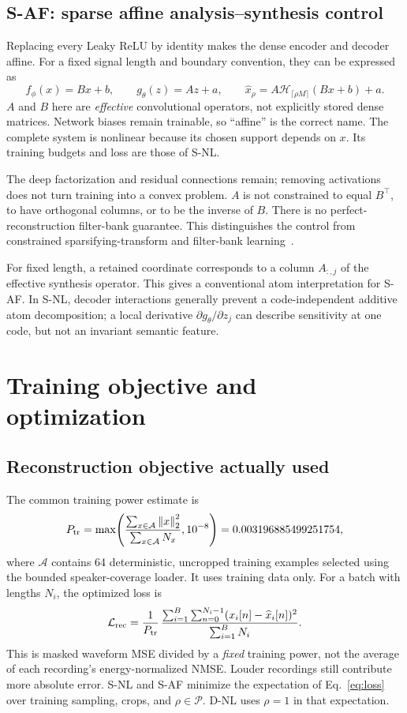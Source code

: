 \documentclass[11pt,a4paper]{article}
\newcommand{\norm}[1]{\left\lVert#1\right\rVert}
\begin{document}
\subsection{S-AF: sparse affine analysis--synthesis control}
Replacing every Leaky ReLU by identity makes the dense encoder and decoder affine. For a fixed signal length and boundary convention, they can be expressed as
\begin{equation}
 f_\phi(x)=Bx+b,\qquad g_\theta(z)=Az+a,
 \qquad \widehat x_\rho=A\mathcal H_{\lceil\rho M\rceil}(Bx+b)+a.
 \label{eq:affine}
\end{equation}
$A$ and $B$ here are \emph{effective} convolutional operators, not explicitly stored dense matrices. Network biases remain trainable, so ``affine'' is the correct name. The complete system is nonlinear because its chosen support depends on $x$. Its training budgets and loss are those of S-NL.

The deep factorization and residual connections remain; removing activations does not turn training into a convex problem. $A$ is not constrained to equal $B^\top$, to have orthogonal columns, or to be the inverse of $B$. There is no perfect-reconstruction filter-bank guarantee. This distinguishes the control from constrained sparsifying-transform and filter-bank learning~\cite{ravishankar2013,pfister2019}.

For fixed length, a retained coordinate corresponds to a column $A_{:,j}$ of the effective synthesis operator. This gives a conventional atom interpretation for S-AF. In S-NL, decoder interactions generally prevent a code-independent additive atom decomposition; a local derivative $\partial g_\theta/\partial z_j$ can describe sensitivity at one code, but not an invariant semantic feature.

\section{Training objective and optimization}
\subsection{Reconstruction objective actually used}
The common training power estimate is
\begin{equation}
 P_{\rm tr}=\max\!\left(\frac{\sum_{x\in\mathcal A}\norm{x}_2^2}{\sum_{x\in\mathcal A}N_x},10^{-8}\right)
 =0.003196885499251754,
\end{equation}
where $\mathcal A$ contains 64 deterministic, uncropped training examples selected using the bounded speaker-coverage loader. It uses training data only. For a batch with lengths $N_i$, the optimized loss is
\begin{equation}
 \mathcal L_{\rm rec}=\frac{1}{P_{\rm tr}}\,
 \frac{\sum_{i=1}^{B}\sum_{n=0}^{N_i-1}(x_i[n]-\widehat x_i[n])^2}
 {\sum_{i=1}^{B}N_i}.
 \label{eq:loss}
\end{equation}
This is masked waveform MSE divided by a \emph{fixed} training power, not the average of each recording's energy-normalized NMSE. Louder recordings still contribute more absolute error. S-NL and S-AF minimize the expectation of Eq.~\eqref{eq:loss} over training sampling, crops, and $\rho\in\mathcal P$. D-NL uses $\rho=1$ in that expectation.
\end{document}
